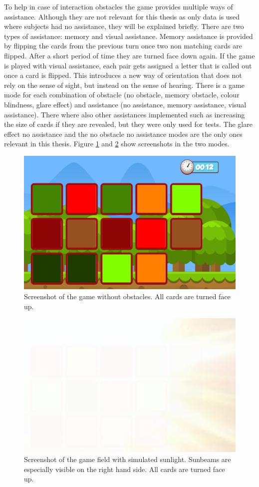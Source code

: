 To help in case of interaction obstacles the game provides multiple ways of assistance. Although they are not relevant for this thesis as only data is used where subjects had no assistance, they will be explained briefly. There are two types of assistance: memory and visual assistance. Memory assistance is provided by flipping the cards from the previous turn once two non matching cards are flipped. After a short period of time they are turned face down again. If the game is played with visual assistance, each pair gets assigned a letter that is called out once a card is flipped. This introduces a new way of orientation that does not rely on the sense of sight, but instead on the sense of hearing. There is a game mode for each combination of obstacle (no obstacle, memory obstacle, colour blindness, glare effect) and assistance (no assistance, memory assistance, visual assistance). There where also other assistances implemented such as increasing the size of cards if they are revealed, but they were only used for tests. The glare effect no assistance and the no obstacle no assistance modes are the only ones relevant in this thesis. Figure \ref{fig:noObstacle} and \ref{fig:glareEffect} show screenshots in the two modes. 

\begin{figure}[H]
	\centering
	\includegraphics[width=14cm]{images/noObstTurned.png}
	\caption[Bild kurz]{Screenshot of the game without obstacles. All cards are turned face up.}
	\label{fig:noObstacle}
\end{figure}

\begin{figure}[H]
	\centering
	\includegraphics[width=14cm]{images/glareEffect.png}
	\caption[Bild kurz]{Screenshot of the game field with simulated sunlight. Sunbeams are especially visible on the right hand side. All cards are turned face up.}
	\label{fig:glareEffect}
\end{figure}